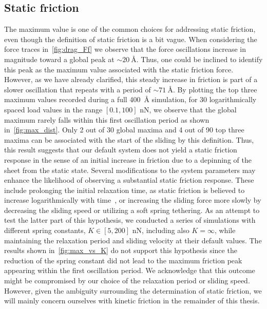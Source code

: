 \subsection{Static friction} 
The maximum value is one of the common choices for addressing static friction,
even though the definition of static friction is a bit vague. When considering
the force traces in~\cref{fig:drag_Ff} we observe that the force oscillations
increase in magnitude toward a global peak at $\sim \SI{20}{\text{Å}}$. Thus,
one could be inclined to identify this peak as the maximum value associated with
the static friction force. However, as we have already clarified, this steady
increase in friction is part of a slower oscillation that repeats with a period
of $\sim \SI{71}{\text{Å}}$. By plotting the top three maximum values recorded
during a full \SI{400}{Å} simulation, for 30 logarithmically spaced load values
in the range $[0.1, 100]$ nN, we observe that the global maximum rarely falls within
this first oscillation period as shown in~\cref{fig:max_dist}. Only 2 out of 30
global maxima and 4 out of 90 top three maxima can be associated with the start
of the sliding by this definition. Thus, this result suggests that our default
system does not yield a static friction response in the sense of an initial
increase in friction due to a depinning of the sheet from the static state.
Several modifications to the system parameters may enhance the likelihood of
observing a substantial static friction response. These include prolonging the
initial relaxation time, as static friction is believed to increase
logarithmically with time~\cite{dieterich_1972}, or increasing the sliding force
more slowly by decreasing the sliding speed or utilizing a soft spring tethering. As an attempt to test the
latter part of this hypothesis, we conducted a series of simulations with
different spring constants, $K\in [5, 200]$ nN, including also $K = \infty$,
while maintaining the relaxation period and sliding velocity at their default
values. The results shown in~\ref{fig:max_vs_K} do not support this hypothesis
since the reduction of the spring constant did not lead to the maximum
friction peak appearing within the first oscillation period. We acknowledge that
this outcome might be compromised by our choice of the relaxation period or sliding speed. However, given the
ambiguity surrounding the determination of static friction, we will mainly
concern ourselves with kinetic friction in the remainder of this thesis.



